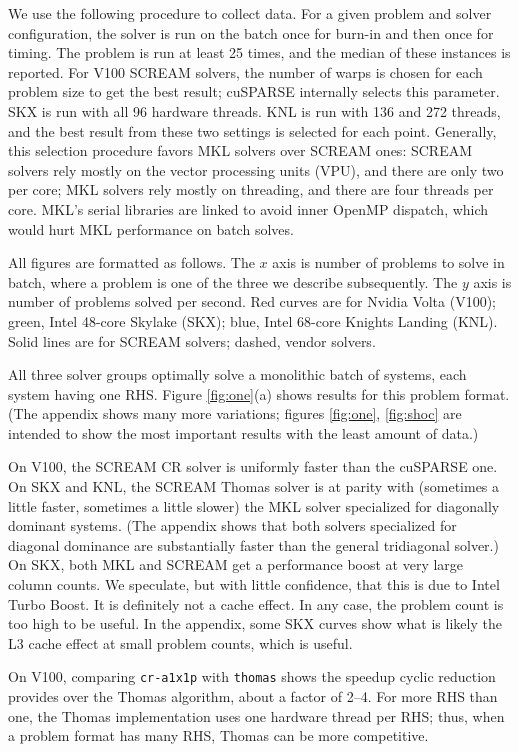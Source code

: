 \documentclass[10pt,twocolumn]{article}
\begin{document}
We use the following procedure to collect data.
For a given problem and solver configuration,
the solver is run on the batch once for burn-in and then once for timing.
The problem is run at least 25 times, and the median of these instances is reported.
For V100 SCREAM solvers,
the number of warps is chosen for each problem size to get the best result;
cuSPARSE internally selects this parameter.
SKX is run with all 96 hardware threads.
KNL is run with 136 and 272 threads,
and the best result from these two settings is selected for each point.
Generally, this selection procedure favors MKL solvers over SCREAM ones:
SCREAM solvers rely mostly on the vector processing units (VPU), and there are only two per core;
MKL solvers rely mostly on threading, and there are four threads per core.
MKL's serial libraries are linked to avoid inner OpenMP dispatch,
which would hurt MKL performance on batch solves.

All figures are formatted as follows.
The $x$ axis is number of problems to solve in batch,
where a problem is one of the three we describe subsequently.
The $y$ axis is number of problems solved per second.
Red curves are for Nvidia Volta (V100);
green, Intel 48-core Skylake (SKX);
blue, Intel 68-core Knights Landing (KNL).
Solid lines are for SCREAM solvers; dashed, vendor solvers.

All three solver groups optimally solve a monolithic batch of systems, each system having one RHS.
Figure \ref{fig:one}(a) shows results for this problem format.
(The appendix shows many more variations;
figures \ref{fig:one}, \ref{fig:shoc} are intended to show the most important results with the least amount of data.)

On V100, the SCREAM CR solver is uniformly faster than the cuSPARSE one.
On SKX and KNL, the SCREAM Thomas solver is at parity with (sometimes a little faster, sometimes a little slower) the MKL solver specialized for diagonally dominant systems.
(The appendix shows that both solvers specialized for diagonal dominance are substantially faster than the general tridiagonal solver.)
On SKX, both MKL and SCREAM get a performance boost at very large column counts.
We speculate, but with little confidence, that this is due to Intel Turbo Boost.
It is definitely not a cache effect.
In any case, the problem count is too high to be useful.
In the appendix, some SKX curves show what is likely the L3 cache effect at small problem counts,
which is useful.

On V100, comparing {\tt cr-a1x1p} with {\tt thomas} shows the speedup cyclic reduction provides over the Thomas algorithm,
about a factor of 2--4.
For more RHS than one, the Thomas implementation uses one hardware thread per RHS;
thus, when a problem format has many RHS, Thomas can be more competitive.
\end{document}

